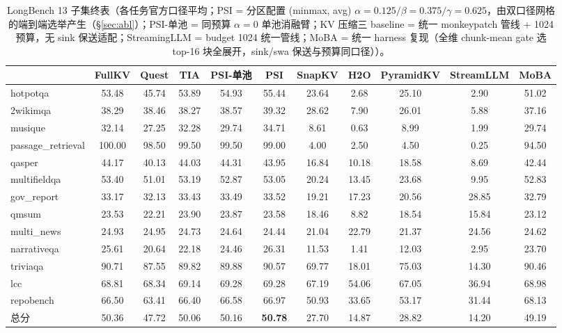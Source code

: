 \documentclass[11pt]{article}
\begin{document}
\begin{table}[h]\centering
\small\setlength{\tabcolsep}{2.2pt}
\caption{LongBench 13 子集终表（各任务官方口径平均；PSI = 分区配置 (minmax, avg) $\alpha{=}0.125/\beta{=}0.375/\gamma{=}0.625$，由双口径网格的端到端选举产生（\S\ref{sec:abl}）；PSI-单池 = 同预算 $\alpha{=}0$ 单池消融臂；KV 压缩三 baseline = 统一 monkeypatch 管线 + 1024 预算，无 sink 保送适配；StreamingLLM = budget 1024 统一管线；MoBA = 统一 harness 复现（全维 chunk-mean gate 选 top-16 块全展开，sink/swa 保送与预算同口径））。}
\label{tab:longbench}
\begin{tabular}{lcccccccccc}
\toprule
 & FullKV & Quest & TIA & PSI-单池 & PSI & SnapKV & H2O & PyramidKV & StreamLLM & MoBA \\

\midrule
hotpotqa & 53.48 & 45.74 & 53.89 & 54.93 & 55.44 & 23.64 & 2.68 & 25.10 & 2.90 & 51.02 \\
2wikimqa & 38.29 & 38.46 & 38.27 & 38.57 & 39.32 & 28.62 & 7.90 & 26.01 & 5.88 & 37.16 \\
musique & 32.14 & 27.25 & 32.28 & 29.74 & 34.71 & 8.61 & 0.63 & 8.99 & 1.99 & 29.74 \\
passage\_retrieval & 100.00 & 98.50 & 99.50 & 99.50 & 99.00 & 4.00 & 2.50 & 4.50 & 0.25 & 94.50 \\
qasper & 44.17 & 40.13 & 44.03 & 44.31 & 43.95 & 16.84 & 10.18 & 18.58 & 8.69 & 42.44 \\
multifieldqa & 53.40 & 51.01 & 53.19 & 52.87 & 53.05 & 20.24 & 13.45 & 23.68 & 9.95 & 52.83 \\
gov\_report & 33.17 & 32.13 & 33.43 & 33.49 & 33.52 & 19.21 & 17.23 & 20.56 & 28.85 & 32.79 \\
qmsum & 23.53 & 22.21 & 23.90 & 23.87 & 23.58 & 18.46 & 8.82 & 18.54 & 15.84 & 23.12 \\
multi\_news & 24.93 & 24.95 & 24.73 & 24.64 & 24.44 & 21.04 & 22.79 & 21.37 & 24.56 & 24.62 \\
narrativeqa & 25.61 & 20.64 & 22.18 & 24.46 & 26.31 & 11.53 & 1.41 & 12.03 & 2.95 & 23.70 \\
triviaqa & 90.71 & 87.55 & 89.82 & 89.88 & 90.57 & 69.77 & 18.01 & 75.03 & 14.30 & 90.46 \\
lcc & 68.81 & 68.34 & 69.14 & 69.28 & 69.28 & 67.19 & 54.06 & 67.05 & 36.94 & 68.98 \\
repobench & 66.50 & 63.41 & 66.40 & 66.58 & 66.97 & 50.93 & 33.65 & 53.17 & 31.44 & 68.13 \\
总分 & 50.36 & 47.72 & 50.06 & 50.16 & \textbf{50.78} & 27.70 & 14.87 & 28.82 & 14.20 & 49.19 \\
\bottomrule
\end{tabular}
\end{table}
\end{document}
